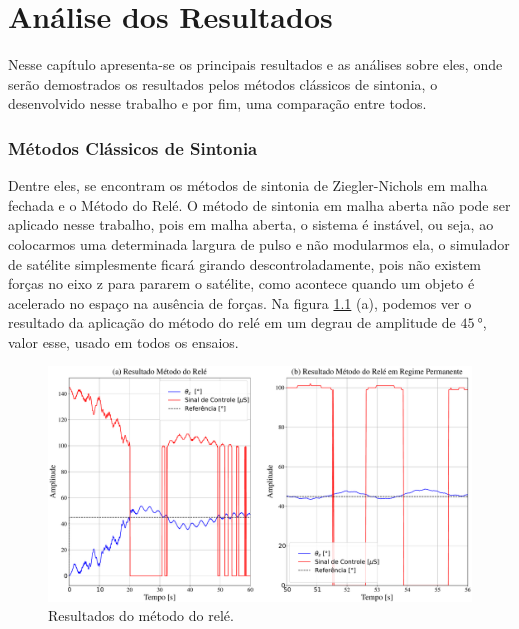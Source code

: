 \chapter{Análise dos Resultados}

Nesse capítulo apresenta-se os principais resultados e as análises sobre eles, onde serão demostrados os resultados pelos métodos clássicos de sintonia, o desenvolvido nesse trabalho e por fim, uma comparação entre todos.


\subsection{Métodos Clássicos de Sintonia}

Dentre eles, se encontram os métodos de sintonia de Ziegler-Nichols em malha fechada e o Método do Relé. O método de sintonia em malha aberta não pode ser aplicado nesse trabalho, pois em malha aberta, o sistema é instável, ou seja, ao colocarmos uma determinada largura de pulso e não modularmos ela, o simulador de satélite simplesmente ficará girando descontroladamente, pois não existem forças no eixo z para pararem o satélite, como acontece quando um objeto é acelerado no espaço na ausência de forças. Na figura \ref{fig:relay} (a), podemos ver o resultado da aplicação do método do relé em um degrau de amplitude de $\SI{45}{\degree}$, valor esse, usado em todos os ensaios.

\begin{figure}[H]
  \caption{Resultados do método do relé.}
  \begin{center}
      \includegraphics[width=\textwidth]{resultados/img/relay}
  \end{center}
  \label{fig:relay}
\end{figure}
 

